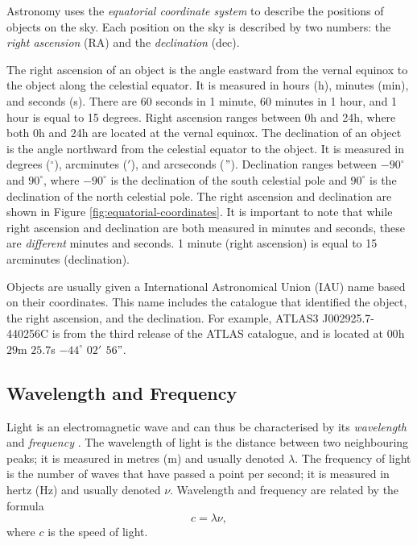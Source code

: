             Astronomy uses the \emph{equatorial coordinate system} to describe
            the positions of objects on the sky. Each position on the sky is
            described by two numbers: the \emph{right ascension} (RA) and the
            \emph{declination} (dec).

            The right ascension of an object is the angle eastward from the
            vernal equinox to the object along the celestial equator. It is
            measured in hours (h), minutes (min), and seconds (s). There are 60
            seconds in 1 minute, 60 minutes in 1 hour, and 1 hour is equal to 15
            degrees. Right ascension ranges between 0h and 24h, where both 0h
            and 24h are located at the vernal equinox. The declination of an
            object is the angle northward from the celestial equator to the
            object. It is measured in degrees (${}^\circ$), arcminutes ($'$),
            and arcseconds ($"$). Declination ranges between $-90^\circ$ and
            $90^\circ$, where $-90^\circ$ is the declination of the south
            celestial pole and $90^\circ$ is the declination of the north
            celestial pole. The right ascension and declination are shown in
            Figure \ref{fig:equatorial-coordinates}. It is important to note
            that while right ascension and declination are both measured in
            minutes and seconds, these are \emph{different} minutes and seconds.
            1 minute (right ascension) is equal to 15 arcminutes (declination).

            Objects are usually given a International Astronomical Union (IAU)
            name based on their coordinates. This name includes the catalogue
            that identified the object, the right ascension, and the
            declination. For example, ATLAS3 J002925.7-440256C is from the third
            release of the ATLAS catalogue, and is located at $00$h $29$m
            $25.7$s $-44^\circ$ $02'$ $56"$.

        \subsection{Wavelength and Frequency}
        \label{sec:wavelength}

            Light is an electromagnetic wave and can thus be characterised by
            its \emph{wavelength} and \emph{frequency} \citep{griffiths99}. The
            wavelength of light is the distance between two neighbouring peaks;
            it is measured in metres (m) and usually denoted $\lambda$. The
            frequency of light is the number of waves that have passed a point
            per second; it is measured in hertz (Hz) and usually denoted $\nu$.
            Wavelength and frequency are related by the formula
            \[
                c = \lambda \nu,
            \]
            where $c$ is the speed of light.

